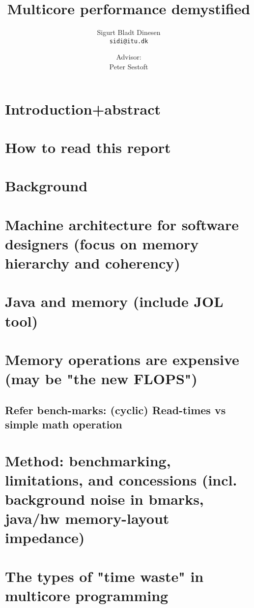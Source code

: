 \documentclass[a4paper, titlepage]{article}
\renewcommand{\%}{\scalebox{.9}{\oldpct}}
\begin{document}
\title{Multicore performance demystified}
\author{
	Sigurt Bladt Dinesen
	\\\texttt{sidi@itu.dk}
	\and
	Advisor:
	\\Peter Sestoft
}

\maketitle
\tableofcontents
\clearpage

\section{Introduction+abstract}
\section{How to read this report}
\section{Background}

\section{Machine architecture for software designers (focus on memory hierarchy and coherency)}

\section{Java and memory (include JOL tool)}

\section{Memory operations are expensive (may be "the new FLOPS")}
\subsection{Refer bench-marks: (cyclic) Read-times vs simple math operation}

\section{Method: benchmarking, limitations, and concessions (incl. background
noise in bmarks, java/hw memory-layout impedance)}

\section{The types of "time waste" in multicore programming}
\end{document}
